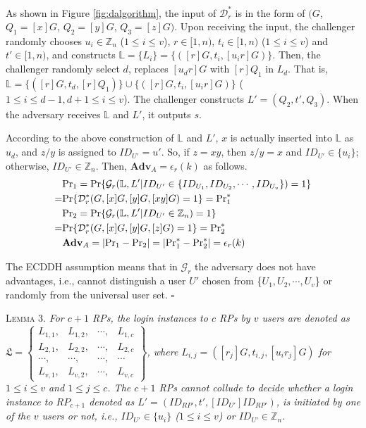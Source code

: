 {{{As shown in Figure \ref{fig:dalgorithm}, the input of $\mathcal{D}^*_r$ is in the form of $(G$, $Q_1=[x]G$, $Q_2=[y]G$, $Q_3=[z]G)$. Upon receiving the input,
the challenger randomly chooses $u_i \in \mathbb{Z}_n$ ($1 \leq i \leq v$), $r \in [1, n)$, $t_i \in [1, n)$ ($1 \leq i \leq v$) and $t' \in [1, n)$, and constructs $\mathbb{L} = \{{L_i}\} = \{([r]G, t_i, [u_ir]G)\}$.
Then, the challenger randomly select $d$, replaces $[u_dr]G$ with $[r]Q_1$ in $L_d$.
 That is, $\mathbb{L} = \{([r]G, t_d, [r]Q_1)\} \cup \{([r]G, t_i, [u_ir]G)\}$ ($1 \leq i \leq d-1, d+1 \leq i \leq v$).
The challenger constructs $L' = (Q_2, t', Q_3)$.
When the adversary receives $\mathbb{L}$ and $L'$, it outputs $s$.

According to the above construction of $\mathbb{L}$ and $L'$,
 $x$ is actually inserted into $\mathbb{L}$ as $u_d$, and $z/y$ is assigned to $ID_{U'} = u'$.
 So, if $z = xy$, then $z/y = x$ and $ID_{U'} \in \{u_i\}$; otherwise, $ID_{U'} \in \mathbb{Z}_n$.
Then, $\mathbf{Adv}_{A} = \epsilon_{r}(k)$ as follows.
\begin{align*}
&{\rm Pr}_1={\rm Pr}\{\mathcal{G}_r(\mathbb{L}, L'|ID_{U'} \in \{ID_{U_1}, ID_{U_2}, \cdots, ID_{U_v}\})=1\} \\=& {\rm Pr}\{\mathcal{D}^*_r(G, [x]G, [y]G, [xy]G)=1\}={\rm Pr}^*_1  \\
&{\rm Pr}_2= {\rm Pr}\{\mathcal{G}_r(\mathbb{L}, L'|ID_{U'} \in \mathbb{Z}_n)=1\} \\=& {\rm Pr}\{\mathcal{D}^*_r(G, [x]G, [y]G, [z]G)=1\} ={\rm Pr}^*_2 \\
&{\mathbf{Adv}}_{A}=|{\rm Pr}_1-{\rm Pr}_2|=|{\rm Pr}^*_1-{\rm Pr}^*_2|=\epsilon_{r}(k)
\end{align*}

The ECDDH assumption means that in $\mathcal{G}_r$ the adversary does not have advantages, i.e., cannot distinguish a user $U'$ chosen from \{${U_1}, {U_2}, \cdots, {U_v}$\} or randomly from the universal user set.
\hfill $\square$



\oldc
\vspace{1mm}
\noindent\textsc{Lemma 3.} {\em For $c+1$ RPs,
    the login instances to $c$ RPs by $v$ users are denoted as
 $\mathfrak{L}=\left \{ \begin{matrix}
L_{1,1},&L_{1,2},&\cdots,&L_{1,c}\\
L_{2,1},& L_{2,2},&\cdots,&L_{2,c}\\
\cdots,&\cdots,&\cdots,&\cdots\\
L_{v,1},&L_{v,2},&\cdots,&L_{v,c}
\end{matrix}\right\}$, where
 $L_{i, j}=([r_j]G, t_{i,j}, [u_ir_j]G)$ for $1 \le i \le v$ and $1 \le j \le c$.
The $c+1$ RPs cannot collude to decide
    whether a login instance to $RP_{c+1}$ denoted as $L' = (ID_{RP'}, t', [ID_{U'}]ID_{RP'})$,
        is initiated by one of the $v$ users or not, i.e., $ID_{U'} \in \{u_i\}$ ($1 \leq i \leq v$) or $ID_{U'} \in \mathbb{Z}_n$.}


}}}
